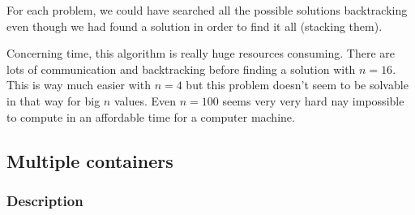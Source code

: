 \documentclass[a4paper,11pt]{article}
\begin{document}
For each problem, we could have searched all the possible solutions backtracking even 
though we had found a solution in order to find it all (stacking them).
  
Concerning time, this algorithm is really huge resources consuming. There are lots of 
communication and backtracking before finding a solution with $n = 16$. This is way much 
easier with $n = 4$ but this problem doesn't seem to be solvable in that way for big $n$ 
values. Even $n = 100$ seems very very hard nay impossible to compute in an affordable 
time for a computer machine.
  

  \subsection{Multiple containers}

  \subsubsection{Description}
\end{document}
